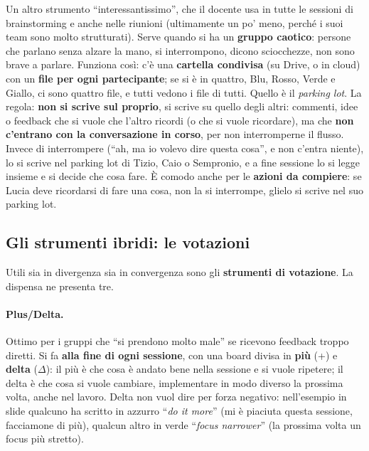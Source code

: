 Un altro strumento ``interessantissimo'', che il docente usa in tutte le sessioni di
brainstorming e anche nelle riunioni (ultimamente un po' meno, perché i suoi team sono
molto strutturati). Serve quando si ha un \textbf{gruppo caotico}: persone che parlano
senza alzare la mano, si interrompono, dicono sciocchezze, non sono brave a parlare.
Funziona così: c'è una \textbf{cartella condivisa} (su Drive, o in cloud) con un
\textbf{file per ogni partecipante}; se si è in quattro, Blu, Rosso, Verde e Giallo, ci sono
quattro file, e tutti vedono i file di tutti. Quello è il \emph{parking lot}. La regola:
\textbf{non si scrive sul proprio}, si scrive su quello degli altri: commenti, idee o
feedback che si vuole che l'altro ricordi (o che si vuole ricordare), ma che \textbf{non
c'entrano con la conversazione in corso}, per non interromperne il flusso. Invece di
interrompere (``ah, ma io volevo dire questa cosa'', e non c'entra niente), lo si scrive
nel parking lot di Tizio, Caio o Sempronio, e a fine sessione lo si legge insieme e si
decide che cosa fare. È comodo anche per le \textbf{azioni da compiere}: se Lucia deve
ricordarsi di fare una cosa, non la si interrompe, glielo si scrive nel suo parking lot.

\subsection{Gli strumenti ibridi: le votazioni}



Utili sia in divergenza sia in convergenza sono gli \textbf{strumenti di votazione}. La
dispensa ne presenta tre.

\paragraph{Plus/Delta.} Ottimo per i gruppi che ``si prendono molto male'' se ricevono
feedback troppo diretti. Si fa \textbf{alla fine di ogni sessione}, con una board divisa in
\textbf{più} (+) e \textbf{delta} ($\Delta$): il più è che cosa è andato bene nella sessione
e si vuole ripetere; il delta è che cosa si vuole cambiare, implementare in modo diverso la
prossima volta, anche nel lavoro. Delta non vuol dire per forza negativo: nell'esempio in
slide qualcuno ha scritto in azzurro ``\emph{do it more}'' (mi è piaciuta questa sessione,
facciamone di più), qualcun altro in verde ``\emph{focus narrower}'' (la prossima volta un
focus più stretto).

